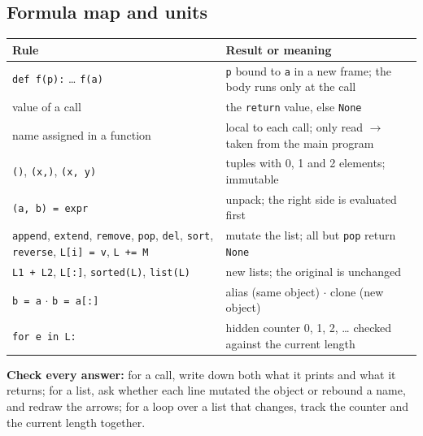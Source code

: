 \documentclass[11pt]{article}
\begin{document}
\begin{keepsection}
\section{Formula map and units}

\begin{center}\small\begin{tabularx}{\linewidth}{>{\raggedright\arraybackslash}X>{\raggedright\arraybackslash}X}\toprule
\textbf{Rule} & \textbf{Result or meaning} \\ \midrule
\texttt{def f(p):} … \texttt{f(a)} & \texttt{p} bound to \texttt{a} in a new frame; the body runs only at the call \\
value of a call & the \texttt{return} value, else \texttt{None} \\
name assigned in a function & local to each call; only read \ensuremath{\to} taken from the main program \\
\texttt{()}, \texttt{(x,)}, \texttt{(x, y)} & tuples with 0, 1 and 2 elements; immutable \\
\texttt{(a, b) = expr} & unpack; the right side is evaluated first \\
\texttt{append}, \texttt{extend}, \texttt{remove}, \texttt{pop}, \texttt{del}, \texttt{sort}, \texttt{reverse}, \texttt{L[i] = v}, \texttt{L += M} & mutate the list; all but \texttt{pop} return \texttt{None} \\
\texttt{L1 + L2}, \texttt{L[:]}, \texttt{sorted(L)}, \texttt{list(L)} & new lists; the original is unchanged \\
\texttt{b = a} \ensuremath{\cdot} \texttt{b = a[:]} & alias (same object) \ensuremath{\cdot} clone (new object) \\
\texttt{for e in L:} & hidden counter 0, 1, 2, … checked against the current length \\
\bottomrule\end{tabularx}\end{center}

\begin{notebox}\textbf{Check every answer:} for a call, write down both what it prints and what it returns; for a list, ask whether each line mutated the object or rebound a name, and redraw the arrows; for a loop over a list that changes, track the counter and the current length together.\end{notebox}
\end{keepsection}
\end{document}
